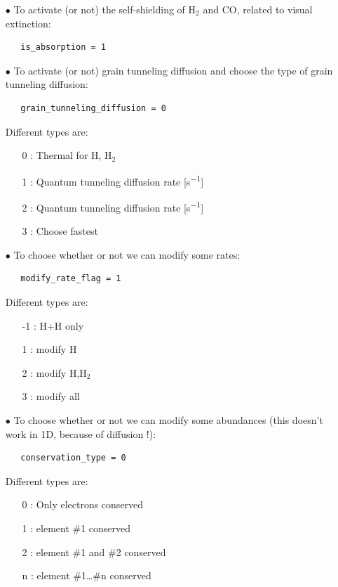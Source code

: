 \documentclass[english,a4paper,twoside]{article}
\newcommand{\molecule}[1]{\ensuremath{\mathrm{#1}}}
\begin{document}
\begin{itemize}
   \item[$\bullet$] To activate (or not) the self-shielding of $\molecule{H_2}$ and $\molecule{CO}$, related to visual extinction: 
   \begin{verbatim}
   is_absorption = 1
   \end{verbatim}

   \item[$\bullet$] To activate (or not) grain tunneling diffusion and choose the type of grain tunneling diffusion: 
   \begin{verbatim}
   grain_tunneling_diffusion = 0
   \end{verbatim}
   Different types are:
   \begin{itemize}
   \item[0] : Thermal for H, \molecule{H_2}
   \item[1] : Quantum tunneling diffusion rate [\unit{s^{-1}}] \citep{1976RvMP...48..513W}
   \item[2] : Quantum tunneling diffusion rate [\unit{s^{-1}}] \citep{1992ApJS...82..167H}
   \item[3] : Choose fastest
   \end{itemize}

   \item[$\bullet$] To choose whether or not we can modify some rates:
   \begin{verbatim}
   modify_rate_flag = 1
   \end{verbatim}
   Different types are:
   \begin{itemize}
   \item[-1] : H+H only
   \item[1] : modify H
   \item[2] : modify H,\molecule{H_2}
   \item[3] : modify all
   \end{itemize}

   \item[$\bullet$] To choose whether or not we can modify some abundances (this doesn't work in 1D, because of diffusion !):
   \begin{verbatim}
   conservation_type = 0
   \end{verbatim}
   Different types are:
   \begin{itemize}
   \item[0] : Only electrons conserved
   \item[1] : element \#1 conserved
   \item[2] : element \#1 and \#2 conserved
   \item[n] : element \#1\dots\#n conserved
   \end{itemize}
\end{itemize}
\end{document}
